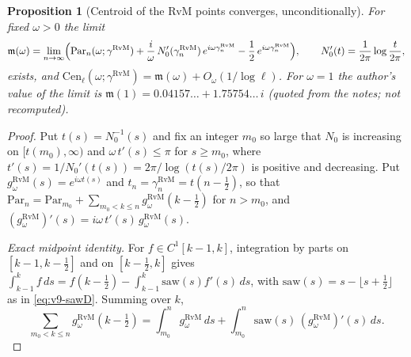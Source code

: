 \documentclass[11pt,a4paper]{article}
\numberwithin{equation}{section}
\newtheorem{proposition}[theorem]{Proposition}
\theoremstyle{definition}
\theoremstyle{remark}
\begin{document}
\begin{proposition}[Centroid of the RvM points converges, unconditionally]\label{prop:v11-rvm}
For fixed $\omega>0$ the limit
\begin{equation}\label{eq:v11-mid}
\mathfrak m(\omega)=\lim_{n\to\infty}\Bigl(\mathrm{Par}_n(\omega;\gamma^{\mathrm{RvM}})+\frac i\omega\,N_0'(\gamma_n^{\mathrm{RvM}})\,e^{i\omega\gamma_n^{\mathrm{RvM}}}-\frac12\,e^{i\omega\gamma_n^{\mathrm{RvM}}}\Bigr),\qquad N_0'(t)=\frac1{2\pi}\log\frac t{2\pi},
\end{equation}
exists, and $\mathrm{Cen}_\ell(\omega;\gamma^{\mathrm{RvM}})=\mathfrak m(\omega)+O_\omega(1/\log\ell)$. For $\omega=1$ the author's value of the limit is $\mathfrak m(1)=0.04157\ldots+1.75754\ldots\,i$ (quoted from the notes; not recomputed).
\end{proposition}
\begin{proof}
Put $t(s)=N_0^{-1}(s)$ and fix an integer $m_0$ so large that $N_0$ is increasing on $[t(m_0),\infty)$ and $\omega\,t'(s)\le\pi$ for $s\ge m_0$, where $t'(s)=1/N_0'(t(s))=2\pi/\log(t(s)/2\pi)$ is positive and decreasing. Put $g^{\mathrm{RvM}}_\omega(s)=e^{i\omega t(s)}$ and $t_n=\gamma_n^{\mathrm{RvM}}=t(n-\frac12)$, so that $\mathrm{Par}_n=\mathrm{Par}_{m_0}+\sum_{m_0<k\le n}g^{\mathrm{RvM}}_\omega(k-\frac12)$ for $n>m_0$, and $(g^{\mathrm{RvM}}_\omega)'(s)=i\omega\,t'(s)\,g^{\mathrm{RvM}}_\omega(s)$.

\emph{Exact midpoint identity.} For $f\in C^1[k-1,k]$, integration by parts on $[k-1,k-\frac12]$ and on $[k-\frac12,k]$ gives $\int_{k-1}^kf\,ds=f(k-\frac12)-\int_{k-1}^k\mathrm{saw}(s)f'(s)\,ds$, with $\mathrm{saw}(s)=s-\lfloor s+\frac12\rfloor$ as in \eqref{eq:v9-sawD}. Summing over $k$,
\begin{equation}\label{eq:v11-mid-exact}
\sum_{m_0<k\le n}g^{\mathrm{RvM}}_\omega(k-\tfrac12)=\int_{m_0}^ng^{\mathrm{RvM}}_\omega\,ds+\int_{m_0}^n\mathrm{saw}(s)\,(g^{\mathrm{RvM}}_\omega)'(s)\,ds .
\end{equation}


\end{proof}
\end{document}
